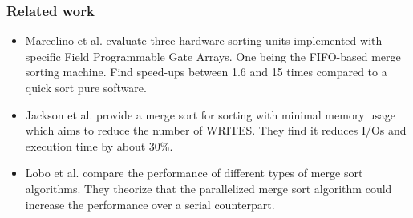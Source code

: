 \begin{frame}[hoved]
	\frametitle{Related work}
	\begin{itemize}
		\item Marcelino et al. evaluate three hardware sorting units implemented
		      with specific Field Programmable Gate Arrays. One being the FIFO-based
		      merge sorting machine. Find speed-ups between 1.6 and 15 times compared to
		      a quick sort pure software.

		\item Jackson et al. provide a merge sort for sorting with minimal memory
		      usage which aims to reduce the number of WRITES. They find it reduces I/Os
		      and execution time by about 30\%.

		\item Lobo et al. compare the performance of different types of merge sort
		      algorithms. They theorize that the parallelized merge sort algorithm could
		      increase the performance over a serial counterpart.
	\end{itemize}
\end{frame}
